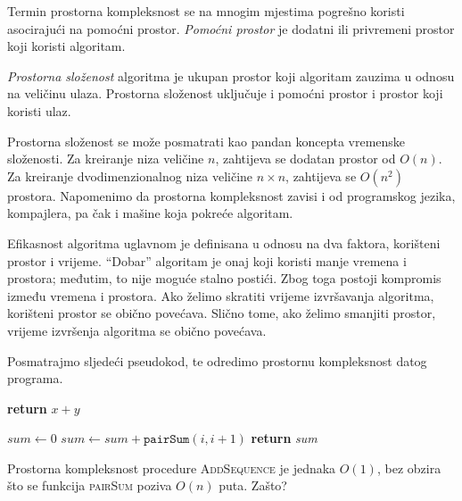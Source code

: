  
 Termin prostorna kompleksnost se na mnogim mjestima pogrešno koristi asocirajući na pomoćni prostor.  \textit{Pomoćni prostor} je dodatni ili privremeni prostor koji koristi algoritam.
 
 \textit{Prostorna složenost} algoritma je ukupan prostor koji algoritam zauzima u odnosu na veličinu ulaza. Prostorna složenost   uključuje i pomoćni prostor i prostor koji koristi ulaz.
 
 Prostorna složenost se može posmatrati kao pandan koncepta vremenske složenosti. Za kreiranje niza veličine $n$, zahtijeva se dodatan prostor od $O(n)$. Za kreiranje dvodimenzionalnog niza veličine $n \times n$,  zahtijeva se $O(n^2)$ prostora.
 Napomenimo da prostorna kompleksnost zavisi i od programskog jezika, kompajlera, pa  čak i mašine koja pokreće algoritam.
 
 
 Efikasnost algoritma uglavnom je definisana u odnosu na  dva faktora, korišteni prostor i vrijeme. ``Dobar'' algoritam je onaj koji koristi manje vremena i prostora; međutim, to nije moguće stalno postići. Zbog toga postoji kompromis između vremena i prostora. Ako želimo skratiti vrijeme izvršavanja algoritma, korišteni prostor se obično povećava. Slično tome, ako želimo smanjiti prostor, vrijeme izvršenja algoritma se obično povećava. %
 
 
 \begin{example}
 	Posmatrajmo sljedeći pseudokod, te odredimo prostornu kompleksnost datog 
 	programa. 
 	
 	
 	\begin{algorithm}[H]
 		\begin{algorithmic}[1]
 			\State	\textbf{return} $x+y$
 			\EndProcedure
 			
 		\end{algorithmic}
 	\end{algorithm}        
 	
 	
 	\begin{algorithm}[H]
 		\begin{algorithmic}[1]
 			
 			\State $sum \gets 0$
 			\State $sum \gets sum + \texttt{pairSum}(i, i+1)$
 			\EndFor
 			\State \textbf{return} \textit{sum}~
 			\EndProcedure
 			
 		\end{algorithmic}
 	\end{algorithm}
 	
 	Prostorna kompleksnost procedure \textsc{AddSequence} je jednaka $O(1)$, bez obzira što se funkcija \textsc{pairSum} poziva $O(n)$ puta. Zašto?
 	
 	
 \end{example}
 
